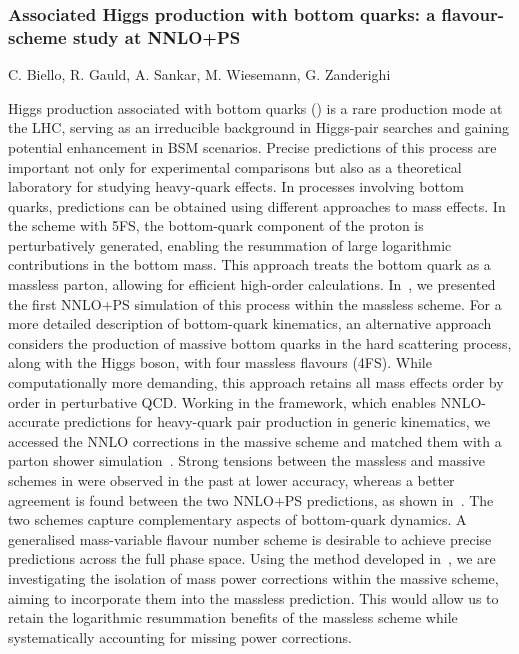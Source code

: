 \documentclass{FBR_Bericht_2025}
\begin{document}
\begin{refsection}
\subsubsection{Associated Higgs production with bottom quarks: a flavour-scheme study at NNLO+PS}
\begin{Namen}
C. Biello, R. Gauld, A. Sankar, M. Wiesemann, G. Zanderighi
\end{Namen}
Higgs production associated with bottom quarks (\bbH{}) is a rare production mode at the LHC, serving as an irreducible background in Higgs-pair searches and gaining potential enhancement in BSM scenarios. Precise predictions of this process are important not only for experimental comparisons but also as a theoretical laboratory for studying heavy-quark effects. In processes involving bottom quarks, predictions can be obtained using different approaches to mass effects. In the scheme with 5FS, the bottom-quark component of the proton is perturbatively generated, enabling the resummation of large logarithmic contributions in the bottom mass. This approach treats the bottom quark as a massless parton, allowing for efficient high-order calculations. In~, we presented the first NNLO+PS simulation of this process within the massless scheme. For a more detailed description of bottom-quark kinematics, an alternative approach considers the production of massive bottom quarks in the hard scattering process, along with the Higgs boson, with four massless flavours (4FS). While computationally more demanding, this approach retains all mass effects order by order in perturbative QCD. Working in the \minnlo{} framework, which enables NNLO-accurate predictions for heavy-quark pair production in generic kinematics, we accessed the NNLO corrections in the massive scheme and matched them with a parton shower simulation~\cite{Biello:2024pgo}. Strong tensions between the massless and massive schemes in \bbH{} were observed in the past at lower accuracy, whereas a better agreement is found between the two NNLO+PS predictions, as shown in~. The two schemes capture complementary aspects of bottom-quark dynamics. A generalised mass-variable flavour number scheme is desirable to achieve precise predictions across the full phase space. Using the method developed in~, we are investigating the isolation of mass power corrections within the massive scheme, aiming to incorporate them into the massless prediction. This would allow us to retain the logarithmic resummation benefits of the massless scheme while systematically accounting for missing power corrections.


\end{refsection}
\end{document}
